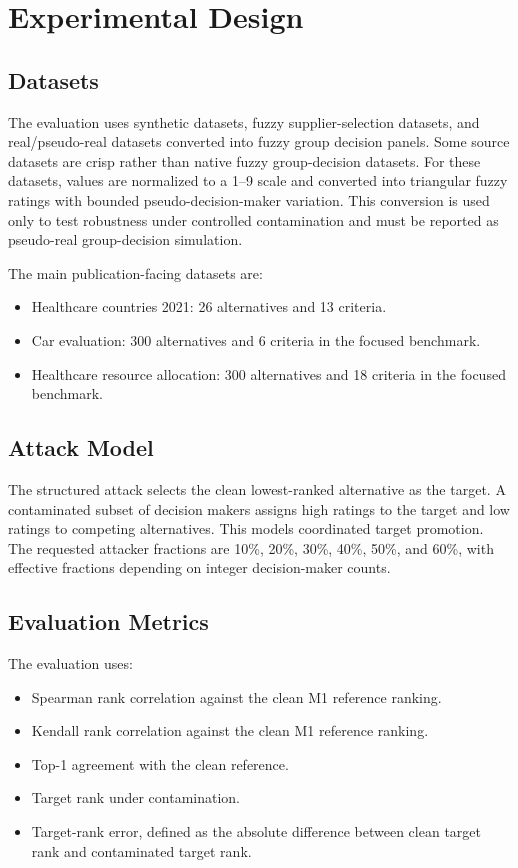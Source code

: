 \chapter{Experimental Design}

\section{Datasets}
The evaluation uses synthetic datasets, fuzzy supplier-selection datasets, and real/pseudo-real datasets converted into fuzzy group decision panels. Some source datasets are crisp rather than native fuzzy group-decision datasets. For these datasets, values are normalized to a 1--9 scale and converted into triangular fuzzy ratings with bounded pseudo-decision-maker variation. This conversion is used only to test robustness under controlled contamination and must be reported as pseudo-real group-decision simulation.

The main publication-facing datasets are:
\begin{itemize}
    \item Healthcare countries 2021: 26 alternatives and 13 criteria.
    \item Car evaluation: 300 alternatives and 6 criteria in the focused benchmark.
    \item Healthcare resource allocation: 300 alternatives and 18 criteria in the focused benchmark.
\end{itemize}

\section{Attack Model}
The structured attack selects the clean lowest-ranked alternative as the target. A contaminated subset of decision makers assigns high ratings to the target and low ratings to competing alternatives. This models coordinated target promotion. The requested attacker fractions are 10\%, 20\%, 30\%, 40\%, 50\%, and 60\%, with effective fractions depending on integer decision-maker counts.

\section{Evaluation Metrics}
The evaluation uses:
\begin{itemize}
    \item Spearman rank correlation against the clean M1 reference ranking.
    \item Kendall rank correlation against the clean M1 reference ranking.
    \item Top-1 agreement with the clean reference.
    \item Target rank under contamination.
    \item Target-rank error, defined as the absolute difference between clean target rank and contaminated target rank.
\end{itemize}

